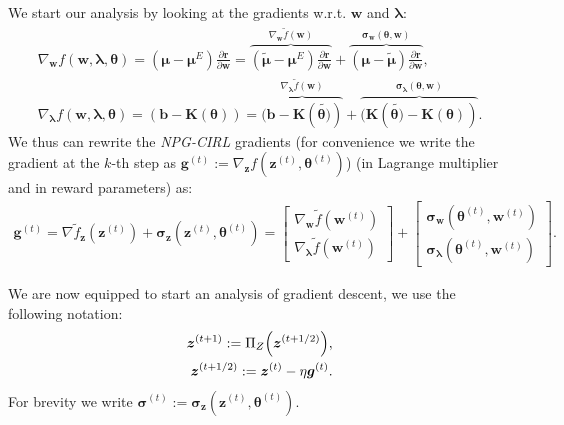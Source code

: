 We start our analysis by looking at the gradients w.r.t. $\bm{w}$ and $\bm{\lambda}$:
\begin{align*}
    \nabla_{\bm{w}} f(\bm{w},\bm{\lambda},{\bm{\theta}}) =
    (\bm{\mu}-\bm{\mu}^E) \frac{\partial \bm{r}}{\partial \bm{w}}
    =  \overbrace{
        (\tilde{\bm{\mu}}-\bm{\mu}^E) \frac{\partial \bm{r}}{\partial \bm{w}}
    }^{ 
        \nabla_{\bm{w}} \tilde{f}(\bm{w})
    }
    +\overbrace{(\bm{\mu}-\tilde{\bm{\mu}}) \frac{\partial \bm{r}}{\partial \bm{w}} }^{
        \bm{\sigma}_{\bm{w}}(\bm{\theta},\bm{w})
    } ,
    \\
    \nabla_{\bm{\lambda}} f(\bm{w},\bm{\lambda},{\bm{\theta}}) =  (\bm{b}-\bm{K}(\bm{\theta})) =  \overbrace{(\bm{b}-\bm{K}(\tilde{\bm{\theta})}) }^{
        \nabla_{\bm{\lambda}} \tilde{f}(\bm{w})
    }+ \overbrace{(\bm{K}(\tilde{\bm{\theta})}-\bm{K}(\bm{\theta}))}^{
        \bm{\sigma}_{\bm{\lambda}}(\bm{\theta},\bm{w})
    }.
\end{align*}
We thus can rewrite the \textit{NPG-CIRL} gradients (for convenience we write the gradient at the $k$-th step as $\bm{g}^{(t)}:=\nabla_{\bm{z}} f(\bm{z}^{(t)},\bm{\theta}^{(t)})$) (in Lagrange multiplier and in reward parameters) as:
\begin{align*}
    \bm{g}^{(t)} = \nabla \tilde{f}_{\bm{z}} (\bm{z}^{(t)}) + \bm{\sigma}_{\bm{z}}(\bm{z}^{(t)},\bm{\theta}^{(t)})
    = \begin{bmatrix}
        \nabla_{\bm{w}} \tilde{f}(\bm{w}^{(t)}) \\
        \nabla_{\bm{\lambda}} \tilde{f}(\bm{w}^{(t)})
    \end{bmatrix}
    + \begin{bmatrix}
        \bm{\sigma}_{\bm{w}}(\bm{\theta}^{(t)},\bm{w}^{(t)}) \\
        \bm{\sigma}_{\bm{\lambda}}(\bm{\theta}^{(t)},\bm{w}^{(t)})
    \end{bmatrix}.
\end{align*}

We are now equipped to start an analysis of gradient descent, we use the following notation:
\begin{align*}
    \bm{z}^{(t+1)} := \Pi_Z \Bigl( \bm{z}^{(t+1/2)}  \Bigr),\\
    \bm{z}^{(t+1/2)} := \bm{z}^{(t)} - \eta \bm{g}^{(t)}.
\end{align*}
For brevity we write $\bm{\sigma}^{(t)} := \bm{\sigma}_{\bm{z}}(\bm{z}^{(t)},\bm{\theta}^{(t)})$. 

